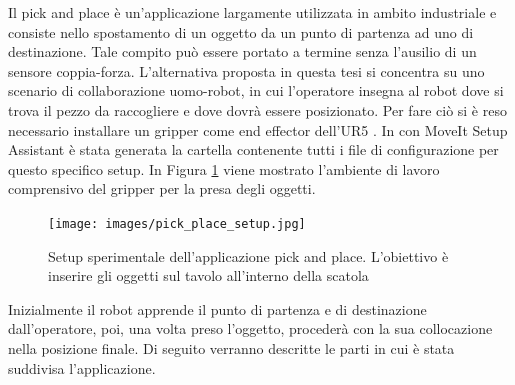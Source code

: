 Il pick and place \`{e} un'applicazione largamente utilizzata in ambito industriale e consiste nello spostamento di un oggetto 
da un punto di partenza ad uno di destinazione. Tale compito pu\`{o} essere portato a termine senza l'ausilio di un sensore 
coppia-forza. L'alternativa proposta in questa tesi si concentra su uno scenario di collaborazione uomo-robot, in cui l'operatore 
insegna al robot dove si trova il pezzo da raccogliere e dove dovr\`{a} essere posizionato. 
Per fare ci\`{o} si \`{e} reso necessario installare un gripper come end effector 
dell'UR5 \cite{gripper_repo}. In \cite{environment_setup} con MoveIt Setup Assistant \`{e} stata generata la cartella contenente 
tutti i file di configurazione per questo specifico setup. 
In Figura \ref{fig:pick_place} viene mostrato l'ambiente di lavoro comprensivo del gripper per la presa degli oggetti. 
\begin{figure}[H]
    \centering
    \texttt{[image: images/pick\_place\_setup.jpg]}
    \caption{Setup sperimentale dell'applicazione pick and place. L'obiettivo \`{e} inserire gli oggetti sul tavolo 
    all'interno della scatola}
    \label{fig:pick_place}
\end{figure}
Inizialmente il robot apprende il punto di partenza e di destinazione dall'operatore, poi, una volta preso l'oggetto, 
proceder\`{a} con la sua collocazione nella posizione finale.
Di seguito verranno descritte le parti in cui \`{e} stata suddivisa l'applicazione.
